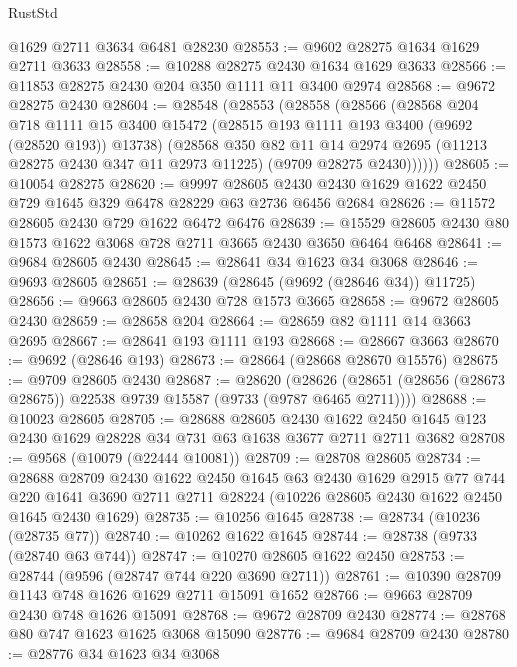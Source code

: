 \begin{lexlean}{RustStd}
\begin{coremodule}
    @1629
    @2711
    @3634
    @6481
    @28230
@28553 := @9602 @28275 @1634 @1629 @2711 @3633
@28558 := @10288 @28275 @2430 @1634 @1629 @3633
@28566 := @11853 @28275 @2430 @204 @350 @1111 @11 @3400 @2974
@28568 := @9672 @28275 @2430
@28604 := @28548
    (@28553
      (@28558
        (@28566
          (@28568
            @204
            @718
            @1111
            @15
            @3400
            @15472
            (@28515 @193 @1111 @193 @3400 (@9692 (@28520 @193)) @13738)
            (@28568
              @350
              @82
              @11
              @14
              @2974
              @2695
              (@11213 @28275 @2430 @347 @11 @2973 @11225)
              (@9709 @28275 @2430))))))
@28605 := @10054 @28275
@28620 := @9997
    @28605
    @2430
    @2430
    @1629
    @1622
    @2450
    @729
    @1645
    @329
    @6478
    @28229
    @63
    @2736
    @6456
    @2684
@28626 := @11572 @28605 @2430 @729 @1622 @6472 @6476
@28639 := @15529 @28605 @2430 @80 @1573 @1622 @3068 @728 @2711 @3665 @2430 @3650 @6464 @6468
@28641 := @9684 @28605 @2430
@28645 := @28641 @34 @1623 @34 @3068
@28646 := @9693 @28605
@28651 := @28639 (@28645 (@9692 (@28646 @34)) @11725)
@28656 := @9663 @28605 @2430 @728 @1573 @3665
@28658 := @9672 @28605 @2430
@28659 := @28658 @204
@28664 := @28659 @82 @1111 @14 @3663 @2695
@28667 := @28641 @193 @1111 @193
@28668 := @28667 @3663
@28670 := @9692 (@28646 @193)
@28673 := @28664 (@28668 @28670 @15576)
@28675 := @9709 @28605 @2430
@28687 := @28620
    (@28626 (@28651 (@28656 (@28673 @28675)) @22538 @9739 @15587 (@9733 (@9787 @6465 @2711))))
@28688 := @10023 @28605
@28705 := @28688
    @28605
    @2430
    @1622
    @2450
    @1645
    @123
    @2430
    @1629
    @28228
    @34
    @731
    @63
    @1638
    @3677
    @2711
    @2711
    @3682
@28708 := @9568 (@10079 (@22444 @10081))
@28709 := @28708 @28605
@28734 := @28688
    @28709
    @2430
    @1622
    @2450
    @1645
    @63
    @2430
    @1629
    @2915
    @77
    @744
    @220
    @1641
    @3690
    @2711
    @2711
    @28224
    (@10226 @28605 @2430 @1622 @2450 @1645 @2430 @1629)
@28735 := @10256 @1645
@28738 := @28734 (@10236 (@28735 @77))
@28740 := @10262 @1622 @1645
@28744 := @28738 (@9733 (@28740 @63 @744))
@28747 := @10270 @28605 @1622 @2450
@28753 := @28744 (@9596 (@28747 @744 @220 @3690 @2711))
@28761 := @10390 @28709 @1143 @748 @1626 @1629 @2711 @15091 @1652
@28766 := @9663 @28709 @2430 @748 @1626 @15091
@28768 := @9672 @28709 @2430
@28774 := @28768 @80 @747 @1623 @1625 @3068 @15090
@28776 := @9684 @28709 @2430
@28780 := @28776 @34 @1623 @34 @3068

\end{coremodule}
\end{lexlean}
